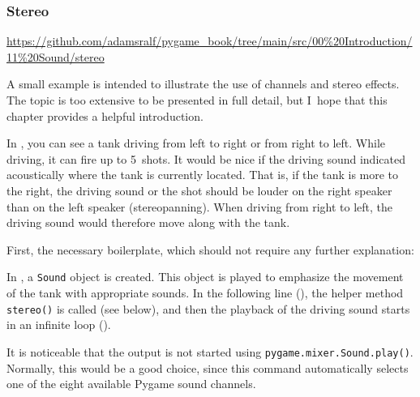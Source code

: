 \subsubsection{Stereo}\label{secStereo}
\begin{diskbox}
	\url{https://github.com/adamsralf/pygame_book/tree/main/src/00%20Introduction/11%20Sound/stereo}
\end{diskbox}

A small example is intended to illustrate the use of channels and \gls{stereo} effects. The topic is too extensive to be presented in full detail, but I~hope that this chapter provides a helpful introduction.

In , you can see a tank driving from left to right or from right to left. While driving, it can fire up to 5~shots. It would be nice if the driving sound indicated acoustically where the tank is currently located. That is, if the tank is more to the right, the driving sound or the shot should be louder on the right speaker than on the left speaker (\gls{stereopanning}). When driving from right to left, the driving sound would therefore move along with the tank.


First, the necessary boilerplate, which should not require any further explanation:



In , a \texttt{Sound} object is created. This object is played to emphasize the movement of the tank with appropriate sounds. In the following line (), the helper method \texttt{stereo()} is called (see below), and then the playback of the driving sound starts in an infinite loop (). 

It is noticeable that the output is not started using \texttt{pygame.mixer.Sound.play()}. Normally, this would be a good choice, since this command automatically selects one of the eight available Pygame sound channels.

